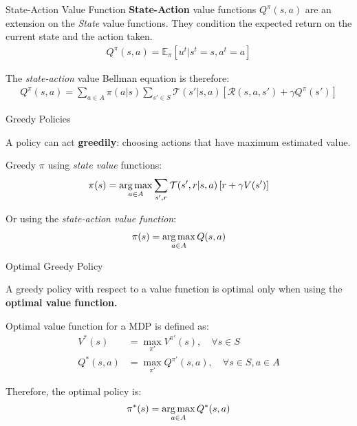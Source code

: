\begin{frame}{State-Action Value Function}
    \textbf{State-Action} value functions $Q^{\pi}(s,a)$ are an extension on the \textit{State} value functions. They condition the expected return on the current state and the action taken.
    \begin{align*}
         Q^{\pi}(s,a) = \mathbb{E}_{\pi}\left[u^{t}|s^{t}=s, a^{t}=a\right]
    \end{align*}

The \textit{state-action} value Bellman equation is therefore:
\vspace{10pt}
\begin{align*}
    Q^{\pi}(s,a) = \sum_{a \in A} \pi(a|s) \sum_{s' \in S} \mathcal{T}(s'|s,a) \left[\mathcal{R}(s,a,s') + \gamma Q^{\pi}(s')\right]
\end{align*}

\end{frame}

\begin{frame}{Greedy Policies}

    A policy can act \textbf{greedily}: choosing actions that have maximum estimated value.
    \vspace{10pt}
    
    Greedy $\pi$ using \textit{state value} functions:
    \vspace{5pt}    
    \begin{align*}
       \pi(s) = \operatorname*{arg\,max}_{a \in A} \sum_{s', r} \mathcal{T}(s', r | s, a) \left[ r + \gamma V(s') \right]
    \end{align*}
    
    Or using the \textit{state-action value function}:
    \vspace{5pt}
    \begin{align*}
        \pi(s) = \operatorname*{arg\,max}_{a \in A}Q(s, a)    
    \end{align*}
    
\end{frame}

\begin{frame}[t]{Optimal Greedy Policy}

   A greedy policy with respect to a value function is optimal only when using the \textbf{optimal value function.} 
    
    Optimal value function for a MDP is defined as:
    \vspace{5pt}
    \begin{align*}
        V^{*}(s) &= \max_{\pi'} V^{\pi'}(s), \quad \forall s \in S \\
        Q^{*}(s, a) &= \max_{\pi'} Q^{\pi'}(s, a), \quad \forall s \in S, a \in A
    \end{align*}

    Therefore, the optimal policy is:
    \vspace{5pt}
    \begin{align*}
        \pi^{*}(s) = \operatorname*{arg\,max}_{a \in A}Q^{*}(s, a)    
    \end{align*}
\end{frame}

